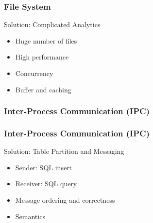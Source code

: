 \begin{frame}
\frametitle{File System}
\begin{block}{Solution: Complicated Analytics}
\begin{itemize}
	\item Huge number of files
	\item High performance 
	\item Concurrency
	\item Buffer and caching
\end{itemize} 
\end{block}
\end{frame}


\subsubsection{Inter-Process Communication (IPC)}

\begin{frame}
\frametitle{Inter-Process Communication (IPC)}
\begin{block}{Solution: Table Partition and Messaging}
\begin{itemize}
	\item Sender: SQL insert 
	\item Receiver: SQL query
	\item Message ordering and correctness
	\item Semantics
\end{itemize} 
\end{block}
\end{frame}


